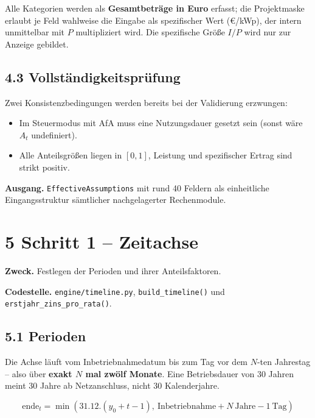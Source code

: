 \documentclass[
  a4paper,
  10pt]{article}
\providecommand{\tightlist}{%
  \setlength{\itemsep}{0pt}\setlength{\parskip}{0pt}}
\begin{document}
Alle Kategorien werden als \textbf{Gesamtbeträge in Euro} erfasst; die
Projektmaske erlaubt je Feld wahlweise die Eingabe als spezifischer Wert
(€/kWp), der intern unmittelbar mit \(P\) multipliziert wird. Die
spezifische Größe \(I/P\) wird nur zur Anzeige gebildet.

\hypertarget{vollstuxe4ndigkeitspruxfcfung}{%
\subsection{4.3
Vollständigkeitsprüfung}\label{vollstuxe4ndigkeitspruxfcfung}}

Zwei Konsistenzbedingungen werden bereits bei der Validierung erzwungen:

\begin{itemize}
\tightlist
\item
  Im Steuermodus mit AfA muss eine Nutzungsdauer gesetzt sein (sonst
  wäre \(A_t\) undefiniert).
\item
  Alle Anteilsgrößen liegen in \([0,1]\), Leistung und spezifischer
  Ertrag sind strikt positiv.
\end{itemize}

\textbf{Ausgang.} \texttt{EffectiveAssumptions} mit rund 40 Feldern als
einheitliche Eingangsstruktur sämtlicher nachgelagerter Rechenmodule.

\hypertarget{schritt-1-zeitachse}{%
\section{5 Schritt 1 -- Zeitachse}\label{schritt-1-zeitachse}}

\textbf{Zweck.} Festlegen der Perioden und ihrer Anteilsfaktoren.

\textbf{Codestelle.} \nolinkurl{engine/timeline.py},
\texttt{build\_timeline()} und \texttt{erstjahr\_zins\_pro\_rata()}.

\hypertarget{perioden}{%
\subsection{5.1 Perioden}\label{perioden}}

Die Achse läuft vom Inbetriebnahmedatum bis zum Tag vor dem \(N\)-ten
Jahrestag -- also über \textbf{exakt \(N\) mal zwölf Monate}. Eine
Betriebsdauer von 30 Jahren meint 30 Jahre ab Netzanschluss, nicht 30
Kalenderjahre.

\[ \mathrm{ende}_t = \min\left(31.12.(y_0 + t - 1),\ \text{Inbetriebnahme} + N\ \text{Jahre} - 1\ \text{Tag}\right) \]
\end{document}
